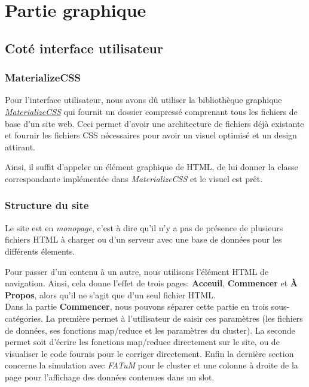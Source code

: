 \section{Partie graphique}


\subsection{Coté interface utilisateur}
\subsubsection{MaterializeCSS}
Pour l'interface utilisateur, nous avons dû utiliser la bibliothèque graphique \href{http://www.materializecss.com/}{{\it MaterializeCSS}} qui fournit un dossier compressé comprenant tous les fichiers de base d'un site web. Ceci permet d'avoir une architecture de fichiers déjà existante et fournir les fichiers CSS nécessaires pour avoir un visuel optimisé et un design attirant.

Ainsi, il suffit d'appeler un élément graphique de HTML, de lui donner la classe correspondante implémentée dans {\it MaterializeCSS} et le visuel est prêt.

\subsubsection{Structure du site}

Le site est en {\it monopage}, c'est à dire qu'il n'y a pas de présence de plusieurs fichiers HTML à charger ou d'un serveur avec une base de données pour les différents élements.

Pour passer d'un contenu à un autre, nous utilisons l'élément HTML de navigation. Ainsi, cela donne l'effet de trois pages: \textbf{Acceuil}, \textbf{Commencer} et \textbf{À Propos}, alors qu'il ne s'agit que d'un seul fichier HTML.\\

Dans la partie \textbf{Commencer}, nous pouvons séparer cette partie en trois sous-catégories. La première permet à l'utilisateur de saisir ces paramètres (les fichiers de données, ses fonctions map/reduce et les paramètres du cluster).
La seconde permet soit d'écrire les fonctions map/reduce directement sur le site, ou de visualiser le code fournis pour le corriger directement.
Enfin la dernière section concerne la simulation avec {\it FATuM} pour le cluster et une colonne à droite de la page pour l'affichage des données contenues dans un slot.

